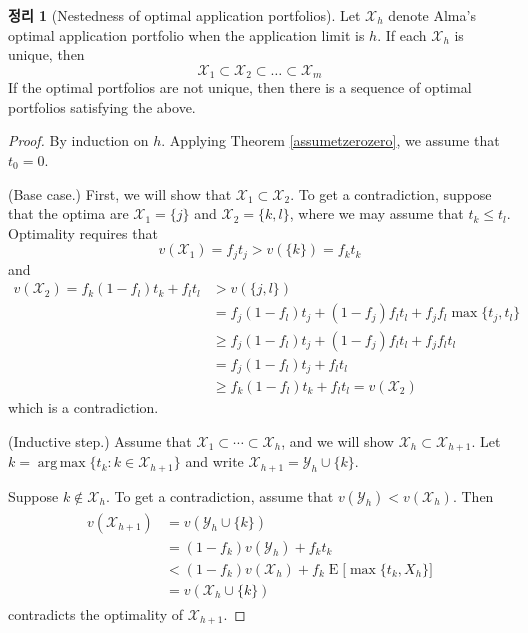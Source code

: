 \documentclass[12pt]{article} %
\DeclareMathOperator*{\argmax}{arg\,max}
\newtheorem{theorem}{Theorem}
\theoremstyle{definition}
\newtheorem{theorem}{정리}
\theoremstyle{definition}
\begin{document}
\begin{theorem}[Nestedness of optimal application portfolios] \label{nestedapplication}
Let $\mathcal{X}_h$ denote Alma’s optimal application portfolio when the application limit is $h$. If each $\mathcal{X}_h$ is unique, then
\begin{equation}
\mathcal{X}_1 \subset \mathcal{X}_2\subset \dots \subset \mathcal{X}_m
\end{equation}
If the optimal portfolios are not unique, then there is a sequence of optimal portfolios satisfying the above.
\end{theorem}
\begin{proof} By induction on $h$. Applying Theorem \ref{assumetzerozero}, we assume that $t_0 = 0$. 

(Base case.) First, we will show that $\mathcal{X}_1 \subset \mathcal{X}_2$. To get a contradiction, suppose that the optima are $\mathcal{X}_1 = \{j\}$ and $\mathcal{X}_2 = \{k, l\}$, where we may assume that $t_k \leq t_l$. Optimality requires that
\begin{equation}v(\mathcal{X}_1 )  = f_j t_j > v(\{k\}) = f_k t_k\end{equation}
and
\begin{align}
v(\mathcal{X}_2) =  f_k (1- f_l) t_k + f_l t_l &> v(\{j, l\}) \\
& = f_j (1- f_l) t_j + (1- f_j) f_l t_l + f_j f_l \max\{t_j, t_l\} \\
&\geq  f_j (1- f_l) t_j + (1- f_j) f_l t_l + f_j f_l  t_l \\
&= f_j (1- f_l) t_j + f_l t_l  \\
&\geq f_k (1- f_l) t_k + f_l t_l  = v(\mathcal{X}_2)
\end{align}
which is a contradiction.

(Inductive step.) Assume that $\mathcal{X}_1 \subset \cdots \subset \mathcal{X}_h$, and we will show $\mathcal{X}_h \subset \mathcal{X}_{h+1}$. Let $k = \argmax\{ t_k: k \in \mathcal{X}_{h+1}\}$ and write $\mathcal{X}_{h+1} = \mathcal{Y}_{h} \cup \{k\}$.

Suppose $k \notin \mathcal{X}_h$.  To get a contradiction, assume that $v(\mathcal{Y}_h) < v(\mathcal{X}_h)$. Then
\begin{align}
\begin{split}
v(\mathcal{X}_{h+1})&= v(\mathcal{Y}_{h} \cup \{k\}) \\
&= (1 - f_k) v(\mathcal{Y}_h) + f_k t_k \\
& < (1 - f_k) v(\mathcal{X}_h) + f_k \operatorname{E}\bigl[ \max\{t_k, X_h\}\bigr]\\
&=  v(\mathcal{X}_h\cup \{k\})
\end{split}
\end{align}
contradicts the optimality of $\mathcal{X}_{h+1}$.


\end{proof}
\end{document}

